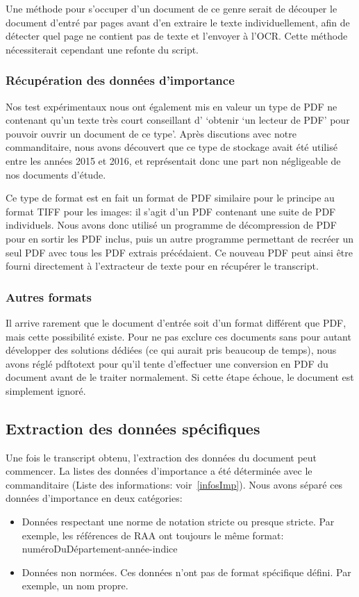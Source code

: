 Une méthode pour s'occuper d'un document de ce genre serait de découper le document d'entré par pages avant d'en extraire le texte individuellement, afin de détecter quel page ne contient pas de texte et l'envoyer à l'OCR\@.
Cette méthode nécessiterait cependant une refonte du script.

\subsubsection{Récupération des données d'importance}
Nos test expérimentaux nous ont également mis en valeur un type de PDF ne contenant qu'un texte très court conseillant d' `obtenir `un lecteur de PDF' pour pouvoir ouvrir un document de ce type'.
Après discutions avec notre commanditaire, nous avons découvert que ce type de stockage avait été utilisé entre les années 2015 et 2016, et représentait donc une part non négligeable de nos documents d'étude.

Ce type de format est en fait un format de PDF similaire pour le principe au format TIFF pour les images: il s'agit d'un PDF contenant une suite de PDF individuels.
Nous avons donc utilisé un programme de décompression de PDF pour en sortir les PDF inclus, puis un autre programme permettant de recréer un seul PDF avec tous les PDF extrais précédaient.
Ce nouveau PDF peut ainsi être fourni directement à l'extracteur de texte pour en récupérer le transcript.

\subsubsection{Autres formats}
Il arrive rarement que le document d'entrée soit d'un format différent que PDF, mais cette possibilité existe.
Pour ne pas exclure ces documents sans pour autant développer des solutions dédiées (ce qui aurait pris beaucoup de temps), nous avons réglé pdftotext pour qu'il tente d'effectuer une conversion en PDF du document avant de le traiter normalement.
Si cette étape échoue, le document est simplement ignoré.



\subsection{Extraction des données spécifiques}
Une fois le transcript obtenu, l'extraction des données du document peut commencer.
La listes des données d'importance a été déterminée avec le commanditaire (Liste des informations: voir~\ref{infosImp}).
Nous avons séparé ces données d'importance en deux catégories:
\begin{itemize}
\item Données respectant une norme de notation stricte ou presque stricte.\newline
Par exemple, les références de RAA ont toujours le même format: numéroDuDépartement-année-indice
\item Données non normées.\newline
Ces données n'ont pas de format spécifique défini.
Par exemple, un nom propre.
\end{itemize}

